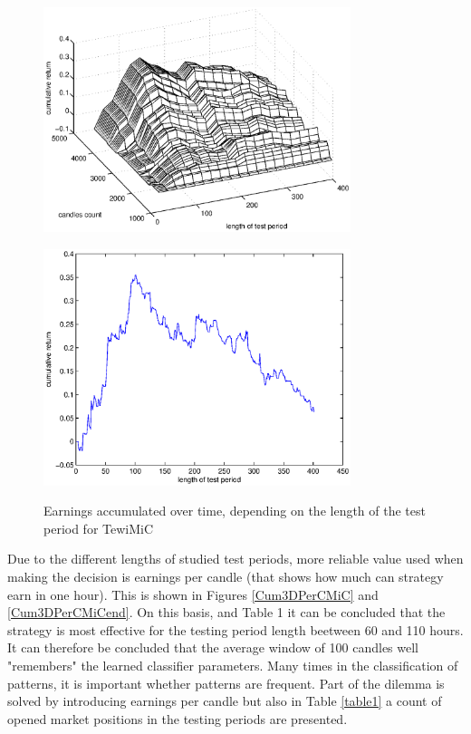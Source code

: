 \documentclass{tewiart}
\begin{document}
\begin{figure}[h!]
\centering
\begin{minipage}{.45\linewidth}
\begin{center}
\includegraphics[width=0.80\textwidth]{pictures/cumulativeReturnsC.eps}
\label{Cum3DMiC}
\end{center}
\end{minipage}
\begin{minipage}{.45\linewidth}
\begin{center}
\includegraphics[width=0.80\textwidth]{pictures/mic_end.eps}
\label{Cum3DMiCend}
\end{center}
\end{minipage}
\caption{Earnings accumulated over time, depending on the length of the test period for TewiMiC}
\end{figure}
\FloatBarrier

Due to the different lengths of studied test periods, more reliable value used when making the decision is earnings per candle (that shows how much can strategy earn in one hour). This is shown in Figures \ref{Cum3DPerCMiC} and \ref{Cum3DPerCMiCend}. On this basis, and Table 1 it can be concluded that the strategy is most effective for the testing period length beetween 60 and 110 hours. It can therefore be concluded that the average window of 100 candles well "remembers" the learned classifier parameters. Many times in the classification of patterns, it is important whether patterns are frequent. Part of the dilemma is solved by introducing earnings per candle but also in Table \ref{table1} a count of opened market positions in the testing periods are presented.\\
\end{document}
